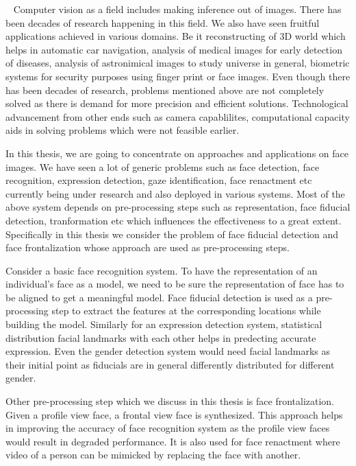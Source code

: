 ~ Computer vision as a field includes making inference out of images. There has been decades of research 
happening in this field. We also have seen fruitful applications achieved in various domains. Be it 
reconstructing of 3D world which helps in automatic car navigation, analysis of medical images for 
early detection of diseases, analysis of astronimical images to study universe in general, biometric
systems for security purposes using finger print or face images. Even though there has been decades of 
research, problems mentioned above are not completely solved as there is demand for more precision
and efficient solutions. Technological advancement from other ends such as camera capablilites,
computational capacity aids in solving problems which were not feasible earlier.

In this thesis, we are going to concentrate on approaches and applications on face images. We have seen
a lot of generic problems such as face detection, face recognition, expression detection, gaze
identification, face renactment etc currently being under research and also deployed in various 
systems. Most of the above system depends on pre-processing steps such as representation, face fiducial 
detection, tranformation etc which influences the effectiveness to a great extent. Specifically in this
thesis we consider the problem of face fiducial detection and face frontalization whose approach are 
used as pre-processing steps.

Consider a basic face recognition system. To have the representation of an individual's face as a 
model, we need to be sure the representation of face has to be aligned to get a meaningful model. 
Face fiducial detection is used as a pre-processing step to extract the features at the corresponding
locations while building the model. Similarly for an expression detection system, statistical 
distribution facial landmarks with each other helps in predecting accurate expression. Even the 
gender detection system would need facial landmarks as their initial point as fiducials are in
general differently distributed for different gender.

Other pre-processing step which we discuss in this thesis is face frontalization. Given a profile
view face, a frontal view face is synthesized. This approach helps in improving the accuracy of 
face recognition system as the profile view faces would result in degraded performance. It is
also used for face renactment where video of a person can be mimicked by replacing the face with
another.
